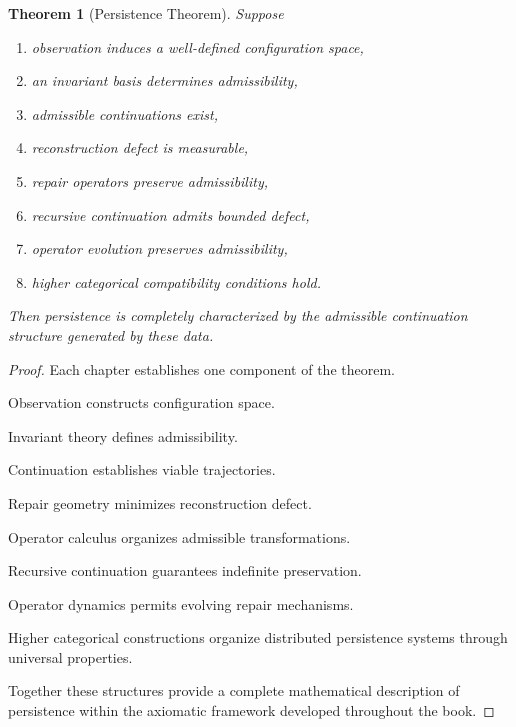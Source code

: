 \documentclass[11pt]{book}
\numberwithin{equation}{chapter}
\theoremstyle{definition}
\theoremstyle{plain}
\newtheorem{theorem}[definition]{Theorem}
\begin{document}
\begin{theorem}[Persistence Theorem]

Suppose

\begin{enumerate}

\item observation induces a well-defined configuration space,

\item an invariant basis determines admissibility,

\item admissible continuations exist,

\item reconstruction defect is measurable,

\item repair operators preserve admissibility,

\item recursive continuation admits bounded defect,

\item operator evolution preserves admissibility,

\item higher categorical compatibility conditions hold.

\end{enumerate}

Then persistence is completely characterized by the admissible
continuation structure generated by these data.

\end{theorem}

\begin{proof}

Each chapter establishes one component of the theorem.

Observation constructs configuration space.

Invariant theory defines admissibility.

Continuation establishes viable trajectories.

Repair geometry minimizes reconstruction defect.

Operator calculus organizes admissible transformations.

Recursive continuation guarantees indefinite preservation.

Operator dynamics permits evolving repair mechanisms.

Higher categorical constructions organize distributed persistence
systems through universal properties.

Together these structures provide a complete mathematical description
of persistence within the axiomatic framework developed throughout the
book.

\end{proof}
\end{document}
